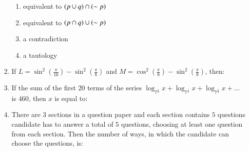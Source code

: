 \documentclass[journal,12pt,onecolumn]{IEEEtran}
\theoremstyle{remark}
\begin{document}
\begin{enumerate}
\begin{enumerate}
 \item equivalent to $\left(p \cup q\right) \cap \left( \sim p\right)$       
 \item equivalent to $\left(p \cap q\right) \cup \left( \sim p\right)$      
 \item a contradiction
  \item a tautology
  \end{enumerate}
  \item If $L = \sin^2\left(\frac{\pi}{16}\right) - \sin^2\left(\frac{\pi}{8}\right)$
 and $M = \cos^2\left(\frac{\pi}{8}\right) - \sin^2\left(\frac{\pi}{8}\right)$, then:                 
 \begin{enumerate}  
 \end{enumerate}
 \item If the sum of the first $20$ terms of the series $\log_{{7}^{\frac{1}{2}}} x + \log_{{7}^{\frac{1}{3}}} x + \log_{{7}^{\frac{1}{4}}} x + \dots$ is $460$, then $x$ is equal to:
 \begin{enumerate}
 \end{enumerate} 
 \item There are $3$ sections in a question paper and each section contains $5$ questions candidate has to answer a total of $5$ questions, choosing at least one question from each section. Then the number of ways, in which the candidate can choose the questions, is:
 \begin{enumerate}
\end{enumerate}
\end{enumerate}
\end{document}
